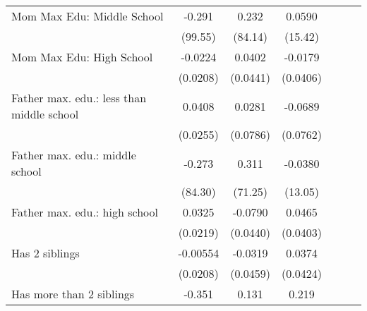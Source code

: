 {\begin{tabular}{l*{6}{c}}
\addlinespace
Mom Max Edu: Middle School&      -0.291         &       0.232         &      0.0590         &                     &                     &                     \\
                    &     (99.55)         &     (84.14)         &     (15.42)         &                     &                     &                     \\
\addlinespace
Mom Max Edu: High School&     -0.0224         &      0.0402         &     -0.0179         &                     &                     &                     \\
                    &    (0.0208)         &    (0.0441)         &    (0.0406)         &                     &                     &                     \\
\addlinespace
Father max. edu.: less than middle school&      0.0408         &      0.0281         &     -0.0689         &                     &                     &                     \\
                    &    (0.0255)         &    (0.0786)         &    (0.0762)         &                     &                     &                     \\
\addlinespace
Father max. edu.: middle school&      -0.273         &       0.311         &     -0.0380         &                     &                     &                     \\
                    &     (84.30)         &     (71.25)         &     (13.05)         &                     &                     &                     \\
\addlinespace
Father max. edu.: high school&      0.0325         &     -0.0790         &      0.0465         &                     &                     &                     \\
                    &    (0.0219)         &    (0.0440)         &    (0.0403)         &                     &                     &                     \\
\addlinespace
Has 2 siblings      &    -0.00554         &     -0.0319         &      0.0374         &                     &                     &                     \\
                    &    (0.0208)         &    (0.0459)         &    (0.0424)         &                     &                     &                     \\
\addlinespace
Has more than 2 siblings&      -0.351         &       0.131         &       0.219         &                     &                     &                     \\

\end{tabular}}
